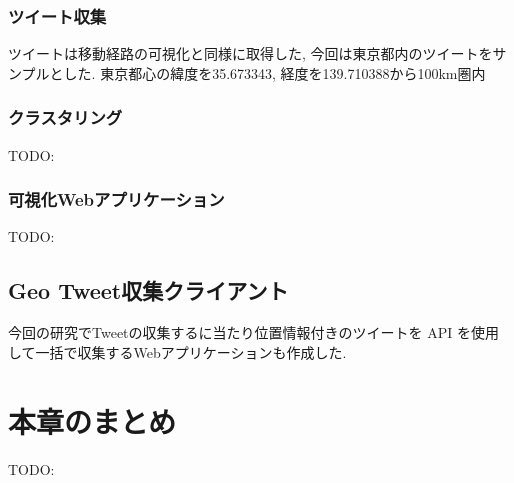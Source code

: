 \subsubsection{ツイート収集}
ツイートは移動経路の可視化と同様に取得した, 今回は東京都内のツイートをサンプルとした.
東京都心の緯度を35.673343, 経度を139.710388から100km圏内

\subsubsection{クラスタリング}
TODO:

\subsubsection{可視化Webアプリケーション}
TODO:

\subsection{Geo Tweet収集クライアント}
今回の研究でTweetの収集するに当たり位置情報付きのツイートを API を使用して一括で収集するWebアプリケーションも作成した.


\newpage

\section{本章のまとめ}
TODO:




\newpage
